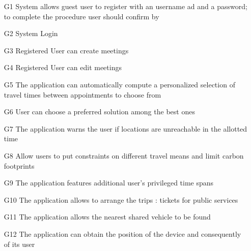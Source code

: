 \begin{enumerate}
	\item
		[G1] System allows guest user to register with an username ad and a password; to complete the procedure user should confirm by 

	\item
		[G2] System Login

	\item 
		[G3] Registered User can create meetings 
	\item 
		[G4] Registered User can edit meetings
	\item 
		[G5] The application can automatically compute a personalized selection of travel times between appointments to choose from
	\item
		[G6] User can choose a preferred solution among the best ones
	\item
		[G7] The application warns the user if locations are unreachable in the allotted time
	\item
		[G8] Allow users to put constraints on different travel means and limit carbon footprints
	\item
		[G9] The application features additional user’s privileged time spans
	\item
		[G10] The application allows to arrange the trips : tickets for public services
	\item	
		[G11] The application allows the nearest shared vehicle to be found
	\item
		[G12] The application can obtain the position of the device and consequently of its user
		
\end{enumerate}	

